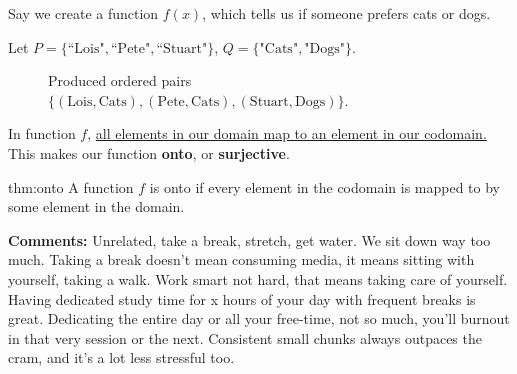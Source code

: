 \noindent
Say we create a function $f(x)$, which tells us if someone prefers cats or dogs.\\

\begin{center}
    Let $P=\{\text{``Lois"}, \text{``Pete"}, \text{``Stuart"}\}$, $Q=\{\text{"Cats"}, \text{"Dogs"}\}$.
\end{center}

\begin{figure}[ht]
    \centering
    \caption{\centering Produced ordered pairs $\{(\text{Lois},\text{Cats}),(\text{Pete},\text{Cats}),(\text{Stuart},\text{Dogs})\}$.}
    \label{fig:cats_dogs}
\end{figure}

\noindent
In function $f$, \underline{all elements in our domain map to an element in our
    codomain.} This makes our function \textbf{onto}, or \textbf{surjective}.\\

\begin{Def}{thm:onto}
    A function $f$ is onto if every element in the codomain is mapped to by some element in the domain.
\end{Def}

\begin{graybox}
    \textbf{Comments:} Unrelated, take a break, stretch, get water. We sit down way
    too much. Taking a break doesn't mean consuming media, it means sitting with yourself, taking a walk.
    Work smart not hard, that means taking care of yourself. Having dedicated study time for x hours of your day
    with frequent breaks is great. Dedicating the entire day or all your free-time, not so much, you'll burnout in
    that very session or the next. Consistent small chunks always outpaces the cram, and it's a lot less stressful too.
    \vspace{-.2em}
\end{graybox}


